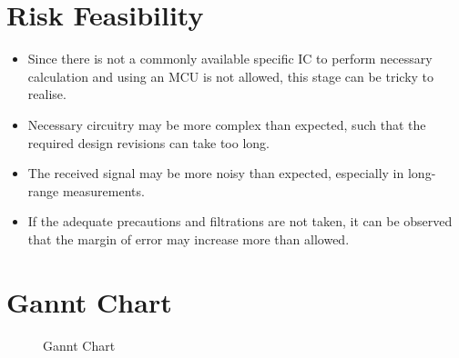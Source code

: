 \documentclass[12pt, a4paper]{article}
\begin{document}
    \section{Risk Feasibility}

        \begin{itemize}
            \item Since there is not a commonly available specific IC to perform necessary calculation and using an MCU is not allowed, this stage can be tricky to realise.
            \item Necessary circuitry may be more complex than expected, such that the required design revisions can take too long.
            \item The received signal may be more noisy than expected, especially in long-range measurements. 
            \item If the adequate precautions and filtrations are not taken, it can be observed that the margin of error may increase more than allowed.
        \end{itemize}   

    \pagebreak
    \section{Gannt Chart}

        \begin{figure}[H]\centering
                \caption{Gannt Chart}
        \end{figure}
\end{document}
